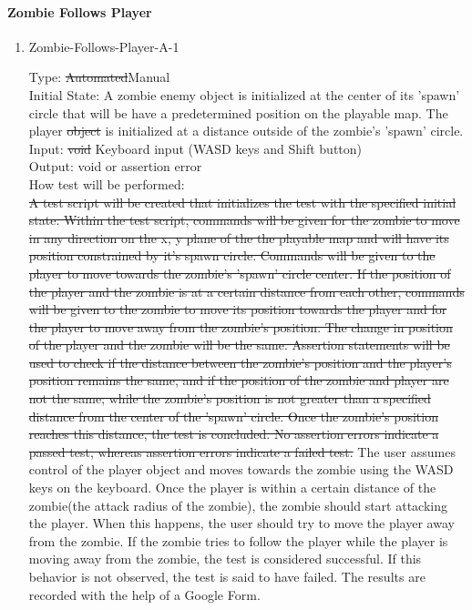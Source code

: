 \documentclass[12pt, titlepage]{article}
\DeclareRobustCommand{\hsout}[1]{\texorpdfstring{\sout{#1}}{#1}}
\newcounter{ftnum}
\begin{document}
\paragraph{Zombie Follows Player}

\begin{enumerate}

\item{Zombie-Follows-Player-A-1\\}  \label{F5-1}

Type: \hsout{Automated}{\color{magenta}Manual}\\
					
Initial State: A zombie enemy object is initialized at the center of its 'spawn' circle that will be have a predetermined position on the playable map. The player \hsout{object} is initialized at a distance outside of the zombie's 'spawn' circle.\\
					
Input: \hsout{void} {\color{magenta} Keyboard input (WASD keys and Shift button)} \\
					
Output: void or assertion error \\
					
How test will be performed:\\\hsout{ A test script will be created that initializes the test with the specified initial state. Within the test script, commands will be given for the zombie to move in any direction on the x, y plane of the the playable map and will have its position constrained by it's spawn circle. Commands will be given to the player to move towards the zombie's 'spawn' circle center. If the position of the player and the zombie is at a certain distance from each other, commands will be given to the zombie to move its position towards the player and for the player to move away from the zombie's position. The change in position of the player and the zombie will be the same. Assertion statements will be used to check if the distance between the zombie's position and the player's position remains the same, and if the position of the zombie and player are not the same; while the zombie's position is not greater than a specified distance from the center of the 'spawn' circle. Once the zombie's position reaches this distance, the test is concluded. No assertion errors indicate a passed test, whereas assertion errors indicate a failed test.} 
{\color{magenta} The user assumes control of the player object and moves towards the zombie using the WASD keys on the keyboard. Once the player is within a certain distance of the zombie(the attack radius of the zombie), the zombie should start attacking the player. When this happens, the user should try to move the player away from the zombie. If the zombie tries to follow the player while the player is moving away from the zombie, the test is considered successful. If this behavior is not observed, the test is said to have failed. The results are recorded with the help of a Google Form.}\\

\end{enumerate}
\end{document}
